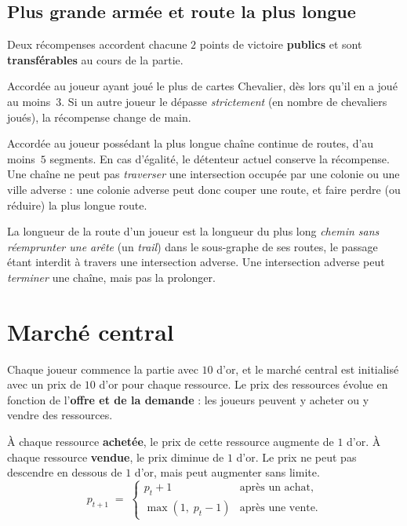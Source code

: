 \documentclass[11pt,a4paper]{article}
\begin{document}
\subsection{Plus grande armée et route la plus longue}

Deux récompenses accordent chacune $2$ points de victoire \textbf{publics} et sont
\textbf{transférables} au cours de la partie.

\begin{description}[leftmargin=1.4cm, style=nextline]
  \item[Plus grande armée] Accordée au joueur ayant joué le plus de cartes Chevalier,
    dès lors qu'il en a joué au moins~$3$. Si un autre joueur le dépasse
    \emph{strictement} (en nombre de chevaliers joués), la récompense change de main.
  \item[Route la plus longue] Accordée au joueur possédant la plus longue chaîne
    continue de routes, d'au moins~$5$ segments. En cas d'égalité, le détenteur actuel
    conserve la récompense. Une chaîne ne peut pas \emph{traverser} une intersection
    occupée par une colonie ou une ville adverse : une colonie adverse peut donc couper
    une route, et faire perdre (ou réduire) la plus longue route.
\end{description}

\begin{remarque}
La longueur de la route d'un joueur est la longueur du plus long \emph{chemin sans
réemprunter une arête} (un \emph{trail}) dans le sous-graphe de ses routes, le passage
étant interdit à travers une intersection adverse. Une intersection adverse peut
\emph{terminer} une chaîne, mais pas la prolonger.
\end{remarque}

\section{Marché central}

Chaque joueur commence la partie avec $10$ d'or, et le marché central est initialisé
avec un prix de $10$ d'or pour chaque ressource. Le prix des ressources évolue en
fonction de l'\textbf{offre et de la demande} : les joueurs peuvent y acheter ou y
vendre des ressources.

\begin{remarque}
À chaque ressource \textbf{achetée}, le prix de cette ressource augmente de $1$ d'or.
À chaque ressource \textbf{vendue}, le prix diminue de $1$ d'or. Le prix ne peut pas
descendre en dessous de $1$ d'or, mais peut augmenter sans limite.
\[
  p_{t+1} \;=\;
  \begin{cases}
    p_t + 1 & \text{après un achat,}\\[2pt]
    \max(1,\; p_t - 1) & \text{après une vente.}
  \end{cases}
\]
\end{remarque}
\end{document}
